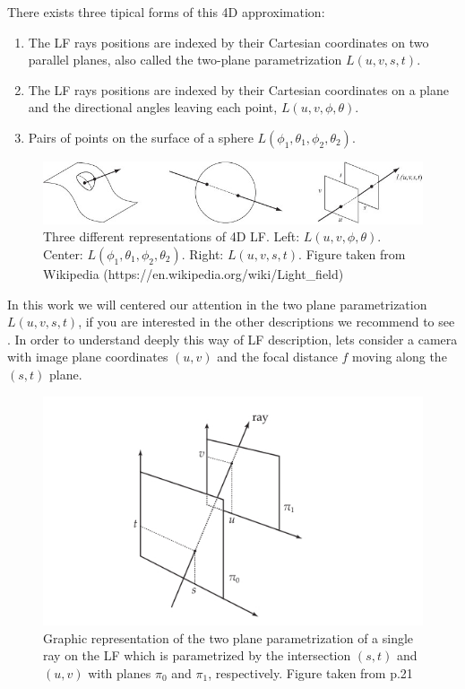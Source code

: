 \bigskip 

 There exists three tipical forms of this 4D approximation: 
\begin{enumerate}
\item The LF rays positions are indexed by their Cartesian coordinates on two parallel planes, also called the two-plane parametrization $L(u,v,s,t)$.
\item The LF rays positions are indexed by their Cartesian coordinates on a plane and the directional angles leaving each point, $L(u,v,\phi,\theta)$.
\item Pairs of points on the surface of a sphere $L(\phi_1,\theta_1,\phi_2,\theta_2)$.
\end{enumerate}

\bigskip

\begin{figure}[h!]
\centering
\includegraphics[width=1.0\textwidth]{./Diagrams/Light-field-parametrizations.jpg}
\caption{Three different representations of 4D LF\@. Left: $L(u,v,\phi,\theta)$. Center: $L(\phi_1,\theta_1,\phi_2,\theta_2)$. Right: $L(u,v,s,t)$. Figure taken from Wikipedia (https://en.wikipedia.org/wiki/Light\_field)}
\end{figure}

\bigskip

In this work we will centered our attention in the two plane parametrization $L(u,v,s,t)$, if you are interested in the other descriptions we recommend to see \cite{Liang}. In order to understand deeply this way of LF description, lets consider a camera with image plane coordinates $(u,v)$ and the focal distance $f$ moving along the $(s,t)$ plane. 

\bigskip

\begin{figure}[h!]
\centering
\includegraphics[width=1.0\textwidth]{./Diagrams/two-planes_param.jpg}
\caption{Graphic representation of the two plane parametrization of a single ray on the LF which is parametrized by the intersection $(s,t)$ and $(u,v)$ with planes $\pi_0$ and $\pi_1$, respectively. Figure taken from \cite{Kim-Disney} p.21}
\end{figure}

